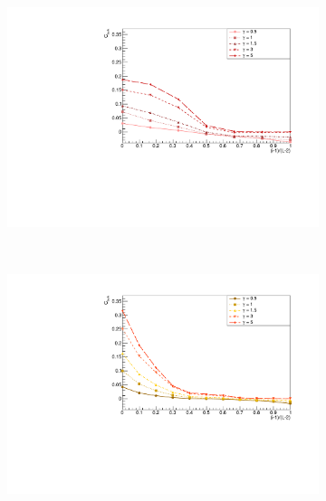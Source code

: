\begin{figure}[H]
\centering
\begin{subfigure}{\columnwidth}
\centering
    \includegraphics[scale=0.55]{Figures/8sites/8sites_BulkCF_CONNvsGamma.pdf}
    \label{fig:8sites_LMvsGamma}
\end{subfigure}\\
\begin{subfigure}{\columnwidth}
\centering
    \includegraphics[scale=0.55]{Figures/12sites/12sites_CFBulkCONNVSgamma.pdf}
    \label{fig:12sites_LMvsGamma}
\end{subfigure}\\
\begin{subfigure}{\columnwidth}
\centering

\end{subfigure}
\end{figure}
